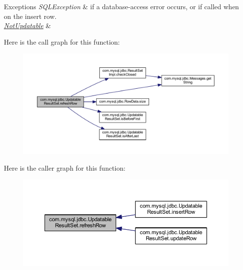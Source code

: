 \begin{DoxyExceptions}{Exceptions}
{\em S\+Q\+L\+Exception} & if a database-\/access error occurs, or if called when on the insert row. \\
\hline
{\em \mbox{\hyperlink{classcom_1_1mysql_1_1jdbc_1_1_not_updatable}{Not\+Updatable}}} & \\
\hline
\end{DoxyExceptions}
Here is the call graph for this function\+:
\nopagebreak
\begin{figure}[H]
\begin{center}
\leavevmode
\includegraphics[width=350pt]{classcom_1_1mysql_1_1jdbc_1_1_updatable_result_set_a7152d037ea38ea45e9cadccd9c9c2639_cgraph}
\end{center}
\end{figure}
Here is the caller graph for this function\+:
\nopagebreak
\begin{figure}[H]
\begin{center}
\leavevmode
\includegraphics[width=350pt]{classcom_1_1mysql_1_1jdbc_1_1_updatable_result_set_a7152d037ea38ea45e9cadccd9c9c2639_icgraph}
\end{center}
\end{figure}
\mbox{\label{classcom_1_1mysql_1_1jdbc_1_1_updatable_result_set_abd0833173b4a94df90e67b08f98079ef}} 
